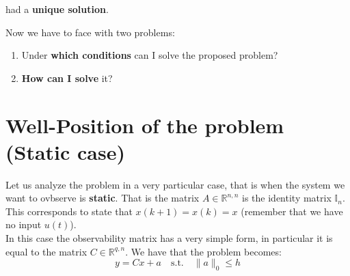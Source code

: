 \hspace*{-5mm}
%


\noindent
had a \textbf{unique solution}.



\noindent
Now we have to face with two problems: 
\begin{enumerate}  
    \setlength\itemsep{0em}
    \item Under \textbf{which conditions} can I solve the proposed problem?
    \item \textbf{How can I solve} it?
\end{enumerate}

\noindent
\section{Well-Position of the problem (Static case)}
Let us analyze the problem in a very particular case, that is when the system we want to ovbserve is \textbf{static}. That is the matrix $A\in \mathbb{R}^{n,n}$ is the identity matrix $\mathbb{I}_n$. This corresponds to state that $x(k+1)=x(k)=x$ (remember that we have no input $u(t)$).\\
In this case the observability matrix has a very simple form, in particular it is equal to the matrix $C\in\mathbb{R}^{q,n}$. We have that the problem becomes: 
{   \large{
    $$y=Cx+a \quad \textrm{s.t.} \quad \lVert a \rVert_{0} \le h$$ }
}

